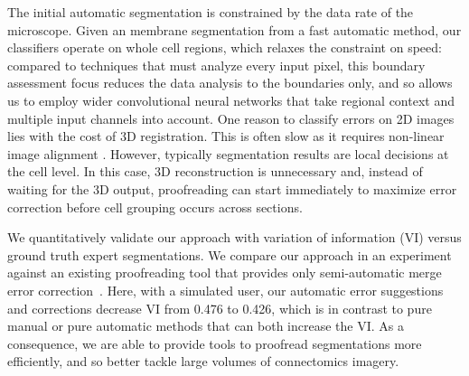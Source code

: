 The initial automatic segmentation is constrained by the data rate of the microscope. Given an membrane segmentation from a fast automatic method, our classifiers operate on whole cell regions, which relaxes the constraint on speed: compared to techniques that must analyze every input pixel, this boundary assessment focus reduces the data analysis to the boundaries only, and so allows us to employ wider convolutional neural networks that take regional context and multiple input channels into account. One reason to classify errors on 2D images lies with the cost of 3D registration. This is often slow as it requires non-linear image alignment \cite{akselrod09,Saalfeld2010Asrigidaspossible}. However, typically segmentation results are local decisions at the cell level. In this case, 3D reconstruction is unnecessary and, instead of waiting for the 3D output, proofreading can start immediately to maximize error correction before cell grouping occurs across sections.

We quantitatively validate our approach with variation of information (VI) versus ground truth expert segmentations. We compare our approach in an experiment against an existing proofreading tool that provides only semi-automatic merge error correction~\cite{haehn_dojo_2014}. Here, with a simulated user, our automatic error suggestions and corrections decrease VI from 0.476 to 0.426, which is in contrast to pure manual or pure automatic methods that can both increase the VI. As a consequence, we are able to provide tools to proofread segmentations more efficiently, and so better tackle large volumes of connectomics imagery.

%
%

